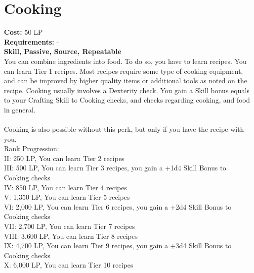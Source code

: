 \section{Cooking}\label{perk:cooking}
\textbf{Cost:} 50 LP\\
\textbf{Requirements:} -\\
\textbf{Skill, Passive, Source, Repeatable}\\
You can combine ingredients into food.
To do so, you have to learn recipes.
You can learn Tier 1 recipes.
Most recipes require some type of cooking equipment, and can be improved by higher quality items or additional tools as noted on the recipe.
Cooking usually involves a Dexterity check.
You gain a Skill bonus equals to your Crafting Skill to Cooking checks, and checks regarding cooking, and food in general. \\
\\
Cooking is also possible without this perk, but only if you have the recipe with you.
\\
Rank Progression:\\
II: 250 LP, You can learn Tier 2 recipes\\
III: 500 LP, You can learn Tier 3 recipes, you gain a +1d4 Skill Bonus to Cooking checks\\
IV: 850 LP, You can learn Tier 4 recipes\\
V: 1,350 LP, You can learn Tier 5 recipes\\
VI: 2,000 LP, You can learn Tier 6 recipes, you gain a +2d4 Skill Bonus to Cooking checks\\
VII: 2,700 LP, You can learn Tier 7 recipes\\
VIII: 3,600 LP, You can learn Tier 8 recipes\\
IX: 4,700 LP, You can learn Tier 9 recipes, you gain a +3d4 Skill Bonus to Cooking checks\\
X: 6,000 LP, You can learn Tier 10 recipes\\